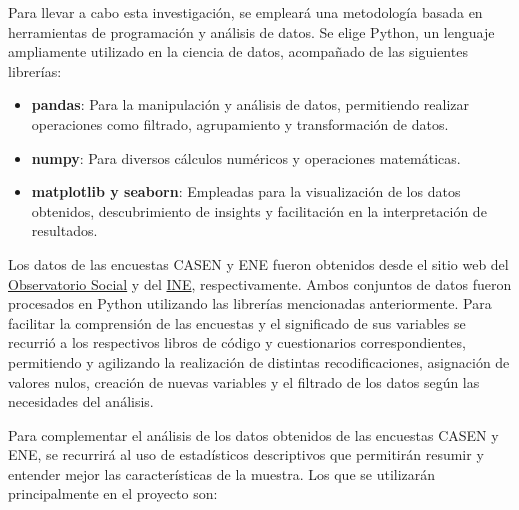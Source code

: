 

Para llevar a cabo esta investigación, se empleará una metodología basada en herramientas de programación y análisis de datos. Se elige Python, un lenguaje ampliamente utilizado en la ciencia de datos, acompañado de las siguientes librerías:

\begin{itemize}
    \item \textbf{pandas}: Para la manipulación y análisis de datos, permitiendo realizar operaciones como filtrado, agrupamiento y transformación de datos.
    \item \textbf{numpy}: Para diversos cálculos numéricos y operaciones matemáticas.
    \item \textbf{matplotlib y seaborn}: Empleadas para la visualización de los datos obtenidos, descubrimiento de insights y facilitación en la interpretación de resultados.
\end{itemize}

Los datos de las encuestas CASEN y ENE fueron obtenidos desde el sitio web del \href{https://observatorio.ministeriodesarrollosocial.gob.cl/encuesta-casen-2022}{Observatorio Social} y del \href{https://www.ine.gob.cl/estadisticas/sociales/mercado-laboral/ocupacion-y-desocupacion}{INE}, respectivamente. Ambos conjuntos de datos fueron procesados en Python utilizando las librerías mencionadas anteriormente. Para facilitar la comprensión de las encuestas y el significado de sus variables se recurrió a los respectivos libros de código y cuestionarios correspondientes, permitiendo y agilizando la realización de distintas recodificaciones, asignación de valores nulos, creación de nuevas variables y el filtrado de los datos según las necesidades del análisis. 

Para complementar el análisis de los datos obtenidos de las encuestas CASEN y ENE, se recurrirá al uso de estadísticos descriptivos que permitirán resumir y entender mejor las características de la muestra. Los que se utilizarán principalmente en el proyecto son:

